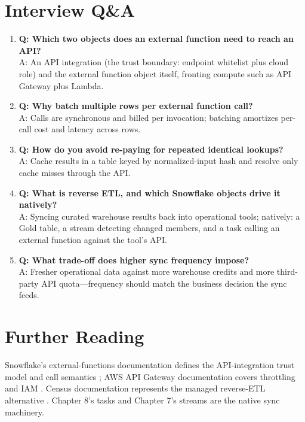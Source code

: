 \section{Interview Q\&A}
\begin{enumerate}
    \item \textbf{Q: Which two objects does an external function need to reach an API?}\\
    A: An API integration (the trust boundary: endpoint whitelist plus cloud role) and the external function object itself, fronting compute such as API Gateway plus Lambda.
    \item \textbf{Q: Why batch multiple rows per external function call?}\\
    A: Calls are synchronous and billed per invocation; batching amortizes per-call cost and latency across rows.
    \item \textbf{Q: How do you avoid re-paying for repeated identical lookups?}\\
    A: Cache results in a table keyed by normalized-input hash and resolve only cache misses through the API.
    \item \textbf{Q: What is reverse ETL, and which Snowflake objects drive it natively?}\\
    A: Syncing curated warehouse results back into operational tools; natively: a Gold table, a stream detecting changed members, and a task calling an external function against the tool's API.
    \item \textbf{Q: What trade-off does higher sync frequency impose?}\\
    A: Fresher operational data against more warehouse credits and more third-party API quota---frequency should match the business decision the sync feeds.
\end{enumerate}

\section{Further Reading}
Snowflake's external-functions documentation defines the API-integration trust model and call semantics \cite{snowflakeExternalFunctionsDocs}; AWS API Gateway documentation covers throttling and IAM \cite{awsApiGatewayDocs}. Census documentation represents the managed reverse-ETL alternative \cite{censusDocs}. Chapter 8's tasks and Chapter 7's streams are the native sync machinery.

